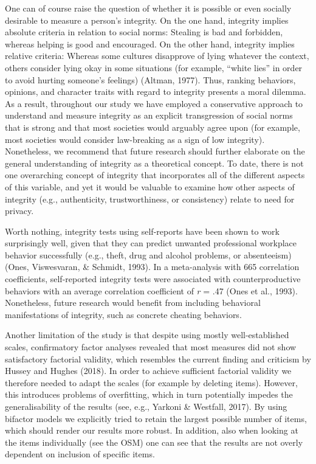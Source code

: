 \documentclass[man,floatsintext]{apa6}
\begin{document}
One can of course raise the question of whether it is possible or even socially desirable to measure a person's integrity. On the one hand, integrity implies absolute criteria in relation to social norms: Stealing is bad and forbidden, whereas helping is good and encouraged. On the other hand, integrity implies relative criteria: Whereas some cultures disapprove of lying whatever the context, others consider lying okay in some situations (for example, \enquote{white lies} in order to avoid hurting someone's feelings) (Altman, 1977). Thus, ranking behaviors, opinions, and character traits with regard to integrity presents a moral dilemma. As a result, throughout our study we have employed a conservative approach to understand and measure integrity as an explicit transgression of social norms that is strong and that most societies would arguably agree upon (for example, most societies would consider law-breaking as a sign of low integrity). Nonetheless, we recommend that future research should further elaborate on the general understanding of integrity as a theoretical concept. To date, there is not one overarching concept of integrity that incorporates all of the different aspects of this variable, and yet it would be valuable to examine how other aspects of integrity (e.g., authenticity, trustworthiness, or consistency) relate to need for privacy.

Worth nothing, integrity tests using self-reports have been shown to work surprisingly well, given that they can predict unwanted professional workplace behavior successfully (e.g., theft, drug and alcohol problems, or absenteeism) (Ones, Viswesvaran, \& Schmidt, 1993). In a meta-analysis with 665 correlation coefficients, self-reported integrity tests were associated with counterproductive behaviors with an average correlation coefficient of \emph{r} = .47 (Ones et al., 1993). Nonetheless, future research would benefit from including behavioral manifestations of integrity, such as concrete cheating behaviors.

Another limitation of the study is that despite using mostly well-established scales, confirmatory factor analyses revealed that most measures did not show satisfactory factorial validity, which resembles the current finding and criticism by Hussey and Hughes (2018). In order to achieve sufficient factorial validity we therefore needed to adapt the scales (for example by deleting items). However, this introduces problems of overfitting, which in turn potentially impedes the generalisability of the results (see, e.g., Yarkoni \& Westfall, 2017). By using bifactor models we explicitly tried to retain the largest possible number of items, which should render our results more robust. In addition, also when looking at the items individually (see the OSM) one can see that the results are not overly dependent on inclusion of specific items.
\end{document}
